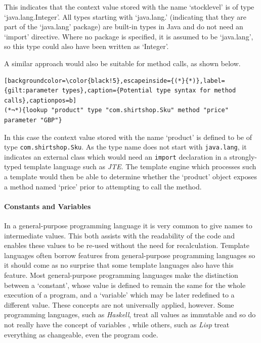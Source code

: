 This indicates that the context value stored with the name `stocklevel' is of type `java.lang.Integer'. All types starting with `java.lang.' (indicating that they are part of the `java.lang' package) are built-in types in Java and do not need an `import' directive. Where no package is specified, it is assumed to be `java.lang', so this type could also have been written as `Integer'.

A similar approach would also be suitable for method calls, as shown below.

\begin{lstlisting}[backgroundcolor=\color{black!5},escapeinside={(*}{*)},label={gilt:parameter types},caption={Potential type syntax for method calls},captionpos=b]
(*¬*){lookup "product" type "com.shirtshop.Sku" method "price" parameter "GBP"}
\end{lstlisting}

In this case the context value stored with the name `product' is defined to be of type \verb!com.shirtshop.Sku!. As the type name does not start with \verb!java.lang!, it indicates an external class which would need an \verb!import! declaration in a strongly-typed template language such as \emph{JTE}. The template engine which processes such a template would then be able to determine whether the `product' object exposes a method named `price' prior to attempting to call the method.

\paragraph{Constants and Variables}

In a general-purpose programming language it is very common to give names to intermediate values. This both assists with the readability of the code and enables these values to be re-used without the need for recalculation. Template languages often borrow features from general-purpose programming languages so it should come as no surprise that some template languages also have this feature. Most general-purpose programming languages make the distinction between a `constant', whose value is defined to remain the same for the whole execution of a program, and a `variable' which may be later redefined to a different value. These concepts are not universally applied, however. Some programming languages, such as \emph{Haskell}, treat all values as immutable and so do not really have the concept of variables \citep{Marlow2010}, while others, such as \emph{Lisp} treat everything as changeable, even the program code.

